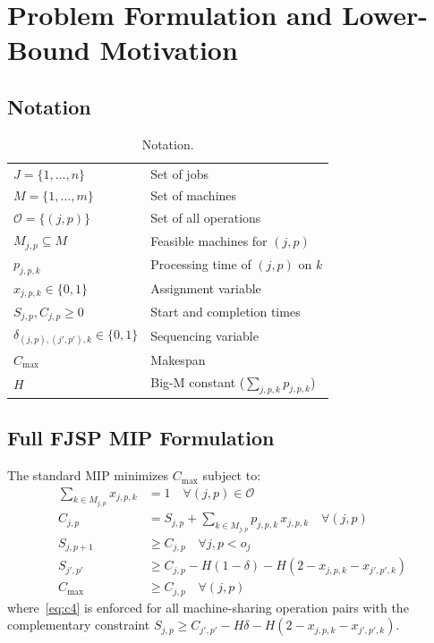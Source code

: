 \documentclass[12pt]{article}
\begin{document}
\section{Problem Formulation and Lower-Bound Motivation}

\subsection{Notation}
\begin{table}[htbp]\centering\caption{Notation.}\label{tab:notation}
\begin{tabular}{ll}\toprule
$J=\{1,\ldots,n\}$ & Set of jobs \\
$M=\{1,\ldots,m\}$ & Set of machines \\
$\mathcal{O}=\{(j,p)\}$ & Set of all operations \\
$M_{j,p}\subseteq M$ & Feasible machines for $(j,p)$ \\
$p_{j,p,k}$ & Processing time of $(j,p)$ on $k$ \\
$x_{j,p,k}\in\{0,1\}$ & Assignment variable \\
$S_{j,p},C_{j,p}\geq 0$ & Start and completion times \\
$\delta_{(j,p),(j',p'),k}\in\{0,1\}$ & Sequencing variable \\
$C_{\max}$ & Makespan \\
$H$ & Big-M constant ($\sum_{j,p,k}p_{j,p,k}$) \\ \bottomrule
\end{tabular}
\end{table}

\subsection{Full FJSP MIP Formulation}
The standard MIP minimizes $C_{\max}$ subject to:
\begin{align}
\sum_{k\in M_{j,p}} x_{j,p,k} &= 1 \quad \forall (j,p)\in\mathcal{O} \label{eq:c1}\\
C_{j,p} &= S_{j,p} + \sum_{k\in M_{j,p}} p_{j,p,k}\,x_{j,p,k} \quad \forall (j,p) \label{eq:c2}\\
S_{j,p+1} &\geq C_{j,p} \quad \forall j, p< o_j \label{eq:c3}\\
S_{j',p'} &\geq C_{j,p} - H(1-\delta) - H(2-x_{j,p,k}-x_{j',p',k}) \label{eq:c4}\\
C_{\max} &\geq C_{j,p} \quad \forall (j,p) \label{eq:c5}
\end{align}
where~\eqref{eq:c4} is enforced for all machine-sharing operation pairs with the complementary constraint $S_{j,p} \geq C_{j',p'} - H\delta - H(2-x_{j,p,k}-x_{j',p',k})$.
\end{document}
